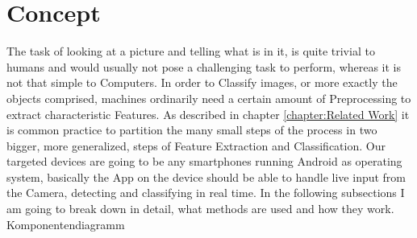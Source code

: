 \chapter{Concept}\label{chapter:Concept}

The task of looking at a picture and telling what is in it, is quite trivial to humans and would usually not pose a challenging task to perform, whereas it is not that simple to Computers. In order to Classify images, or more exactly the objects comprised, machines ordinarily need a certain amount of Preprocessing to extract characteristic Features. As described in chapter \ref{chapter:Related Work} it is common practice to partition the many small steps of the process in two bigger, more generalized, steps of Feature Extraction and Classification. Our targeted devices are going to be any smartphones running Android as operating system, basically the App on the device should be able to handle live input from the Camera, detecting and classifying in real time. In the following subsections I am going to break down in detail, what  methods are used and how they work. \newline
Komponentendiagramm\newline


